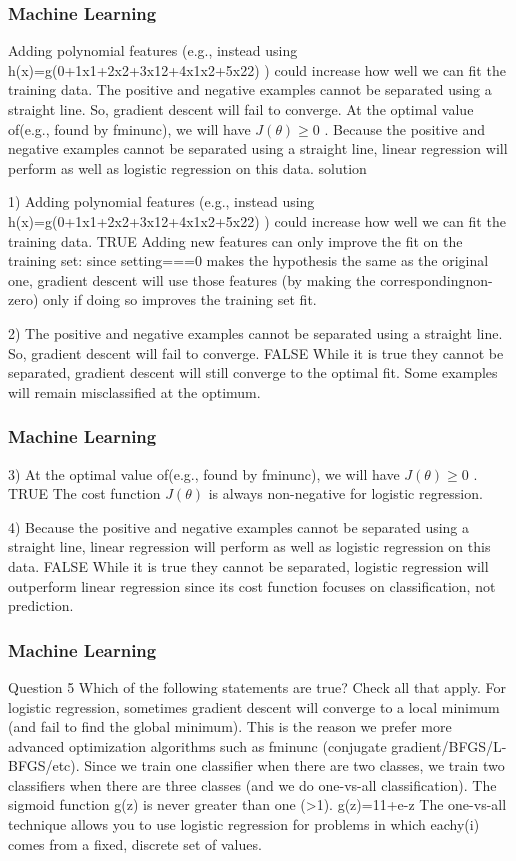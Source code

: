 \begin{frame}
	\frametitle{Machine Learning} 
	\large 
 Adding polynomial features (e.g., instead using h(x)=g(0+1x1+2x2+3x12+4x1x2+5x22) ) could increase how well we can fit the training data.  
The positive and negative examples cannot be separated using a straight line. So, gradient descent will fail to converge.
At the optimal value of\theta (e.g., found by fminunc), we will have $ J(\theta) \geq $0 . 
 Because the positive and negative examples cannot be separated using a straight line, linear regression will perform as well as logistic regression on this data.
solution
 
1)
Adding polynomial features (e.g., instead using h(x)=g(0+1x1+2x2+3x12+4x1x2+5x22) ) could increase how well we can fit the training data.  
TRUE
Adding new features can only improve the fit on the training set: since setting===0 makes the hypothesis the same as the original one, gradient descent will use those features (by making the corresponding\thetaj non-zero) only if doing so improves the training set fit. 
 
2)
The positive and negative examples cannot be separated using a straight line. So, gradient descent will fail to converge. 
FALSE
While it is true they cannot be separated, gradient descent will still converge to the optimal fit. Some examples will remain misclassified at the optimum. 
\end{frame}
\begin{frame}
	\frametitle{Machine Learning} 
	\large 
3)
At the optimal value of\theta (e.g., found by fminunc), we will have $ J(\theta)$$≥$0 . 
TRUE
The cost function $ J(\theta)$ is always non-negative for logistic regression. 
 
4)
Because the positive and negative examples cannot be separated using a straight line, linear regression will perform as well as logistic regression on this data. 
FALSE
While it is true they cannot be separated, logistic regression will outperform linear regression since its cost function focuses on classification, not prediction. 
\end{frame}
\begin{frame}
\frametitle{Machine Learning} 
\large 

Question 5
Which of the following statements are true? Check all that apply.
 For logistic regression, sometimes gradient descent will converge to a local minimum (and fail to find the global minimum). This is the reason we prefer more advanced optimization algorithms such as fminunc (conjugate gradient/BFGS/L-BFGS/etc).
 Since we train one classifier when there are two classes, we train two classifiers when there are three classes (and we do one-vs-all classification).
 The sigmoid function g(z) is never greater than one (>1). g(z)=11+e-z
 The one-vs-all technique allows you to use logistic regression for problems in which eachy(i) comes from a fixed, discrete set of values.
\end{frame}
